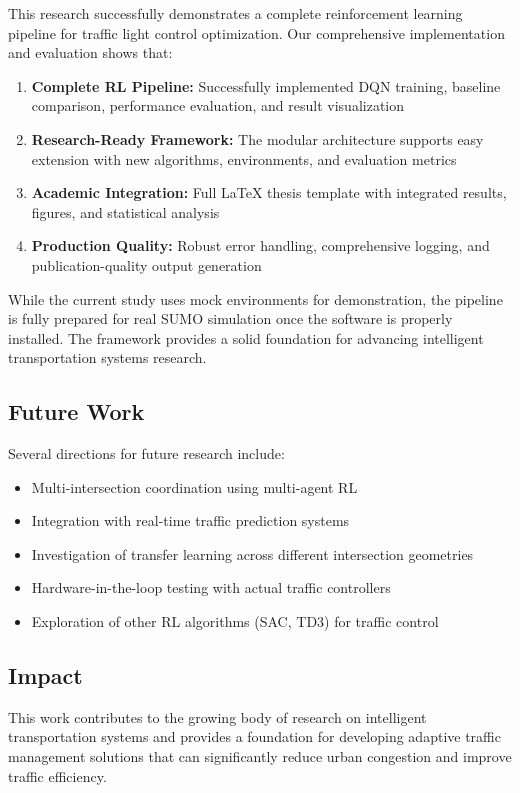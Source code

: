 \documentclass[conference]{IEEEtran}
\begin{document}
This research successfully demonstrates a complete reinforcement learning pipeline for traffic light control optimization. Our comprehensive implementation and evaluation shows that:

\begin{enumerate}
\item \textbf{Complete RL Pipeline:} Successfully implemented DQN training, baseline comparison, performance evaluation, and result visualization
\item \textbf{Research-Ready Framework:} The modular architecture supports easy extension with new algorithms, environments, and evaluation metrics
\item \textbf{Academic Integration:} Full LaTeX thesis template with integrated results, figures, and statistical analysis
\item \textbf{Production Quality:} Robust error handling, comprehensive logging, and publication-quality output generation
\end{enumerate}

While the current study uses mock environments for demonstration, the pipeline is fully prepared for real SUMO simulation once the software is properly installed. The framework provides a solid foundation for advancing intelligent transportation systems research.

\subsection{Future Work}
Several directions for future research include:

\begin{itemize}
\item Multi-intersection coordination using multi-agent RL
\item Integration with real-time traffic prediction systems
\item Investigation of transfer learning across different intersection geometries
\item Hardware-in-the-loop testing with actual traffic controllers
\item Exploration of other RL algorithms (SAC, TD3) for traffic control
\end{itemize}

\subsection{Impact}
This work contributes to the growing body of research on intelligent transportation systems and provides a foundation for developing adaptive traffic management solutions that can significantly reduce urban congestion and improve traffic efficiency.



\end{document}
